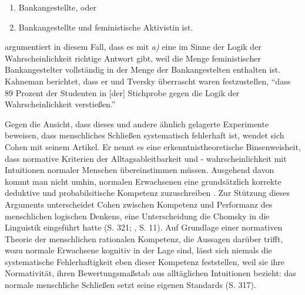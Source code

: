 \documentclass[ngerman,12pt, titlepage, smallheadings, nomath]{scrartcl}
\begin{document}
\begin{enumerate}
\def\labelenumi{\alph{enumi})}
\item
  Bankangestellte, oder
\item
  Bankangestellte und feministische Aktivistin ist.
\end{enumerate}

\textcite{kahneman2012} argumentiert in diesem Fall, dass es mit
\emph{a)} eine im Sinne der Logik der Wahrscheinlichkeit richtige
Antwort gibt, weil die Menge feministischer Bankangestelter vollständig
in der Menge der Bankangestelten enthalten ist. Kahneman berichtet, dass
er und Tversky überrascht waren festzustellen, \enquote{dass 89 Prozent
der Studenten in {[}der{]} Stichprobe gegen die Logik der
Wahrscheinlichkeit verstießen.} \autocite*[Kap. 15]{kahneman2012}

Gegen die Ansicht, dass dieses und andere ähnlich gelagerte Experimente
beweisen, dass menschliches Schließen systematisch fehlerhaft ist,
wendet sich Cohen mit seinem Artikel. Er nennt es eine
erkenntnistheoretische Binsenweisheit, dass normative Kriterien der
Alltagsableitbarkeit und - wahrscheinlichkeit mit Intuitionen normaler
Menschen übereinstimmen müssen. Ausgehend davon kommt man nicht umhin,
normalen Erwachsenen eine grundsätzlich korrekte deduktive und
probabilsitische Kompetenz zuzuschreiben \autocite[362]{cohen1981b}. Zur
Stützung dieses Arguments unterscheidet Cohen zwischen Kompetenz und
Performanz des menschlichen logischen Denkens, eine Unterscheidung die
Chomsky in die Linguistik eingeführt hatte (S. 321;
\textcite{eells1991}, S. 11). Auf Grundlage einer normativen Theorie der
menschlichen rationalen Kompetenz, die Aussagen darüber trifft, wozu
normale Erwachsene kognitiv in der Lage sind, lässt sich niemals die
systematische Fehlerhaftigkeit eben dieser Kompetenz feststellen, weil
sie ihre Normativität, ihren Bewertungsmaßstab aus alltäglichen
Intuitionen bezieht: das normale menschliche Schließen setzt seine
eigenen Standards (S. 317).
\end{document}
